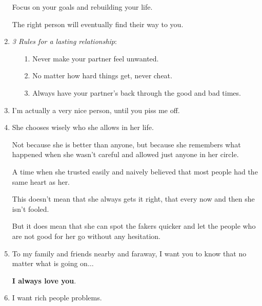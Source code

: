 \documentclass{article}
\numberwithin{equation}{section}
\begin{document}
\begin{enumerate}
    Focus on your goals and rebuilding your life.
    
    The right person will eventually find their way to you.
    \item \textit{3 Rules for a lasting relationship}:
    \begin{itemize}
        \item[1.] Never make your partner feel unwanted.
        \item[2.] No matter how hard things get, never cheat.
        \item[3.] Always have your partner's back through the good and bad times.
    \end{itemize}
    \item I'm actually a very nice person, until you piss me off.
    \item She chooses wisely who she allows in her life.
    
    Not because she is better than anyone, but because she remembers what happened when she wasn't careful and allowed just anyone in her circle.
    
    A time when she trusted easily and naively believed that most people had the same heart as her.
    
    This doesn't mean that she always gets it right, that every now and then she isn't fooled.
    
    But it does mean that she can spot the fakers quicker and let the people who are not good for her go without any hesitation.
    \item To my family and friends nearby and faraway, I want you to know that no matter what is going on$\ldots$
    
    \textbf{I always love you}.
    \item I want rich people problems.
    

\end{enumerate}
\end{document}

